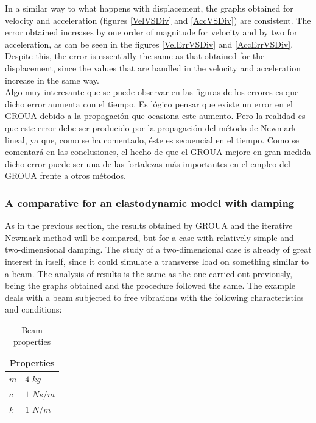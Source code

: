 \documentclass[a4paper, 10pt]{article}
\begin{document}
In a similar way to what happens with displacement, the graphs obtained for velocity and acceleration (figures \ref{VelVSDiv} and \ref{AccVSDiv}) are consistent. The error obtained increases by one order of magnitude for velocity and by two for acceleration, as can be seen in the figures \ref{VelErrVSDiv} and \ref{AccErrVSDiv}. Despite this, the error is essentially the same as that obtained for the displacement, since the values that are handled in the velocity and acceleration increase in the same way.\\

Algo muy interesante que se puede observar en las figuras de los errores es que dicho error aumenta con el tiempo. Es lógico pensar que existe un error en el GROUA debido a la propagación que ocasiona este aumento. Pero la realidad es que este error debe ser producido por la propagación del método de Newmark lineal, ya que, como se ha comentado, éste es secuencial en el tiempo. Como se comentará en las conclusiones, el hecho de que el GROUA mejore en gran medida dicho error puede ser una de las fortalezas más importantes en el empleo del GROUA frente a otros métodos.


\newpage

\subsubsection{A comparative for an elastodynamic model with damping}


As in the previous section, the results obtained by GROUA and the iterative Newmark method will be compared, but for a case with relatively simple and two-dimensional damping. The study of a two-dimensional case is already of great interest in itself, since it could simulate a transverse load on something similar to a beam. The analysis of results is the same as the one carried out previously, being the graphs obtained and the procedure followed the same. The example deals with a beam subjected to free vibrations with the following characteristics and conditions:
 
\begin{table}[htb]
\centering
\caption{Beam properties}
\label{tabla:propiedadesD}
\begin{tabular}{|l|l|}
\hline
\multicolumn{2}{|c|}{Properties} \\ \hline
$m$ & $4$ $kg$ \\
$c$ & $1$ $N s/m$\\
$k$ & $1$ $N/m$\\
\hline
\end{tabular}
\end{table}
\end{document}

